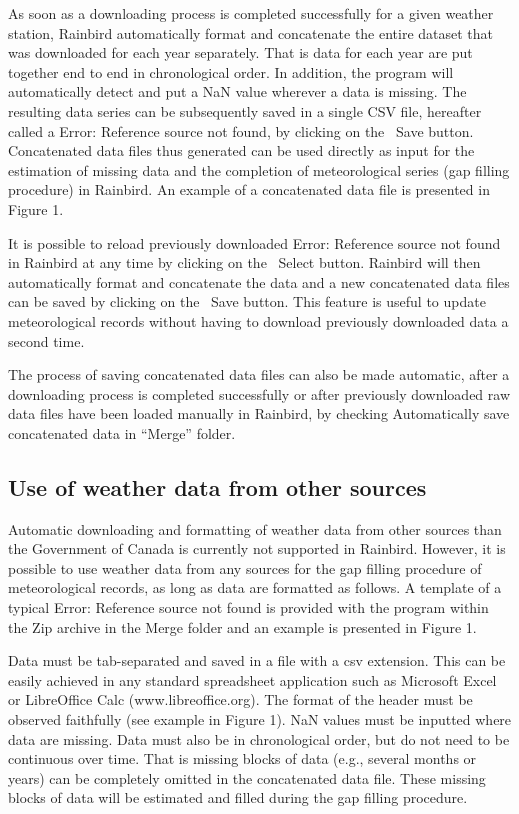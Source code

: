 \documentclass[12pt, letterpaper, fleqn]{report}
\begin{document}
As soon as a downloading process is completed successfully for a given weather station, Rainbird automatically format and concatenate the entire dataset that was downloaded for each year separately. That is data for each year are put together end to end in chronological order. In addition, the program will automatically detect and put a NaN value wherever a data is missing. The resulting data series can be subsequently saved in a single CSV file, hereafter called a Error: Reference source not found, by clicking on the   Save button. Concatenated data files thus generated can be used directly as input for the estimation of missing data and the completion of meteorological series (gap filling procedure) in Rainbird. An example of a concatenated data file is presented in Figure 1.

It is possible to reload previously downloaded Error: Reference source not found in Rainbird at any time by clicking on the  Select button. Rainbird will then automatically format and concatenate the data and a new concatenated data files can be saved by clicking on the  Save button. This feature is useful to update meteorological records without having to download previously downloaded data a second time.

The process of saving concatenated data files can also be made automatic, after a downloading process is completed successfully or after previously downloaded raw data files have been loaded manually in Rainbird, by checking Automatically save concatenated data in “Merge” folder.

\subsection{Use of weather data from other sources}

Automatic downloading and formatting of weather data from other sources than the Government of Canada is currently not supported in Rainbird. However, it is possible to use weather data from any sources for the gap filling procedure of meteorological records, as long as data are formatted as follows. A template of a typical Error: Reference source not found is provided with the program within the Zip archive in the Merge folder and an example is presented in Figure 1.

Data must be tab-separated and saved in a file with a csv extension. This can be easily achieved in any standard spreadsheet application such as Microsoft Excel or LibreOffice Calc (www.libreoffice.org). The format of the header must be observed faithfully (see example in Figure 1). NaN values must be inputted where data are missing. Data must also be in chronological order, but do not need to be continuous over time. That is missing blocks of data (e.g., several months or years) can be completely omitted in the concatenated data file. These missing blocks of data will be estimated and filled during the gap filling procedure.
\end{document}
